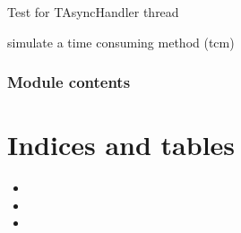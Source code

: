\documentclass[letterpaper,10pt,english]{sphinxmanual}
\begin{document}

\begin{savenotes}\begin{fulllineitems}
\label{\detokenize{eezz:eezz.websocket.test_async_hadler}}
\pysigstartsignatures
{}
\pysigstopsignatures
\sphinxAtStartPar
Test for TAsyncHandler thread

\end{fulllineitems}\end{savenotes}


\begin{savenotes}\begin{fulllineitems}
\label{\detokenize{eezz:eezz.websocket.test_tcm}}
\pysigstartsignatures
{}
\pysigstopsignatures
\sphinxAtStartPar
simulate a time consuming method (tcm)

\end{fulllineitems}\end{savenotes}



\subsection{Module contents}
\label{\detokenize{eezz:module-eezz}}\label{\detokenize{eezz:module-contents}}

\chapter{Indices and tables}
\label{\detokenize{index:indices-and-tables}}\begin{itemize}
\item {} 
\sphinxAtStartPar
{}

\item {} 
\sphinxAtStartPar
{}

\item {} 
\sphinxAtStartPar
{}

\end{itemize}
\end{document}
